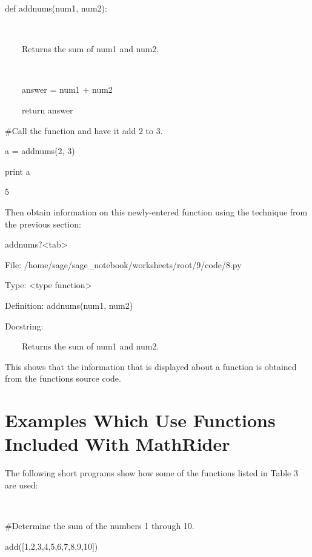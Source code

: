 \documentclass[12pt,twoside]{book}
\begin{document}
def addnums(num1, num2):

\ \ \ \ {\textquotedbl}{\textquotedbl}{\textquotedbl}

\ \ \ \ Returns the sum of num1 and num2.

\ \ \ \ {\textquotedbl}{\textquotedbl}{\textquotedbl}

\ \ \ \ answer = num1 + num2

\ \ \ \ return answer


\bigskip

\#Call the function and have it add 2 to 3.

a = addnums(2, 3)

print a

{\textbar}

5


\bigskip

Then obtain information on this newly{}-entered function using the technique from the previous section: 

\bigskip

addnums?{\textless}tab{\textgreater}

{\textbar}

File: /home/sage/sage\_notebook/worksheets/root/9/code/8.py   

Type: {\textless}type {\textquotesingle}function{\textquotesingle}{\textgreater}

Definition: addnums(num1, num2)        

Docstring:            

              

\ \ \ \ Returns the sum of num1 and num2.       


\bigskip

This shows that the information that is displayed about a function is obtained from the function{\textquotesingle}s source code.

\section[Examples Which Use Functions Included With MathRider]{ Examples Which Use Functions Included With MathRider}

The following short programs show how some of the functions listed in Table 3 are used:

\ 

\#Determine the sum of the numbers 1 through 10.

add([1,2,3,4,5,6,7,8,9,10])

{\textbar}
\end{document}
